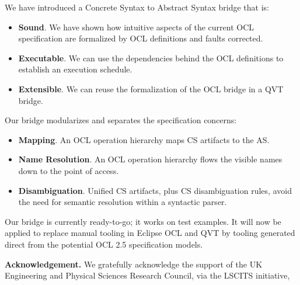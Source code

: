 \documentclass{llncs}
\begin{document}

We have introduced a Concrete Syntax to Abstract Syntax bridge that is:
\begin{itemize}
\item \textbf{Sound}. We have shown how intuitive aspects of the current OCL specification are formalized by OCL definitions and faults corrected.
\item \textbf{Executable}. We can use the dependencies behind the OCL definitions to establish an execution schedule.
\item \textbf{Extensible}. We can reuse the formalization of the OCL bridge in a QVT bridge.
\end{itemize}

Our bridge modularizes and separates the specification concerns:
\begin{itemize}
\item \textbf{Mapping}. An OCL operation hierarchy maps CS artifacts to the AS.
\item \textbf{Name Resolution}. An OCL operation hierarchy flows the visible names down to the point of access.
\item \textbf{Disambiguation}. Unified CS artifacts, plus CS disambiguation rules, avoid the need for semantic resolution within a syntactic parser.
\end{itemize}

Our bridge is currently ready-to-go; it works on test examples. It will now be applied to replace manual tooling in Eclipse OCL and QVT by tooling generated direct from the potential OCL 2.5 specification models.

\vspace*{1mm}
\textbf{Acknowledgement.}
We gratefully acknowledge the support of the UK Engineering and Physical Sciences Research Council, via the LSCITS initiative,




\end{document}
